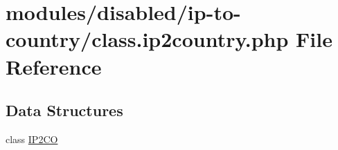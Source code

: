 \hypertarget{class_8ip2country_8php}{\section{modules/disabled/ip-\/to-\/country/class.ip2country.\-php File Reference}
\label{class_8ip2country_8php}
}
\subsection*{Data Structures}
\begin{DoxyCompactItemize}
\item 
class \hyperlink{class_i_p2_c_o}{I\-P2\-C\-O}
\end{DoxyCompactItemize}
